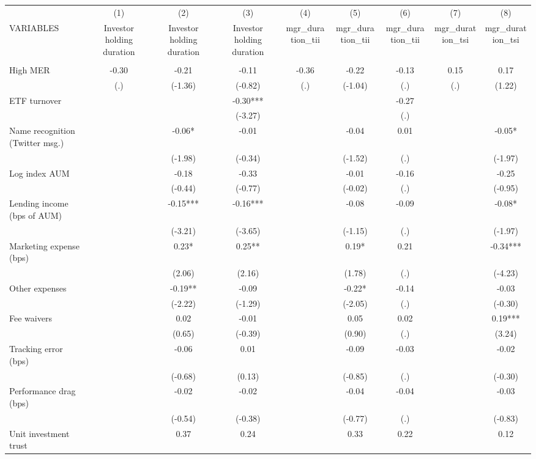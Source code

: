 \documentclass[]{article}
\begin{document}
\begin{tabular}{lcccccccc} \hline
 & (1) & (2) & (3) & (4) & (5) & (6) & (7) & (8) \\
VARIABLES & Investor holding duration & Investor holding duration & Investor holding duration & mgr\_duration\_tii & mgr\_duration\_tii & mgr\_duration\_tii & mgr\_duration\_tsi & mgr\_duration\_tsi \\ \hline
 &  &  &  &  &  &  &  &  \\
High MER & -0.30 & -0.21 & -0.11 & -0.36 & -0.22 & -0.13 & 0.15 & 0.17 \\
 & (.) & (-1.36) & (-0.82) & (.) & (-1.04) & (.) & (.) & (1.22) \\
ETF turnover &  &  & -0.30*** &  &  & -0.27 &  &  \\
 &  &  & (-3.27) &  &  & (.) &  &  \\
Name recognition (Twitter msg.) &  & -0.06* & -0.01 &  & -0.04 & 0.01 &  & -0.05* \\
 &  & (-1.98) & (-0.34) &  & (-1.52) & (.) &  & (-1.97) \\
Log index AUM &  & -0.18 & -0.33 &  & -0.01 & -0.16 &  & -0.25 \\
 &  & (-0.44) & (-0.77) &  & (-0.02) & (.) &  & (-0.95) \\
Lending income (bps of AUM) &  & -0.15*** & -0.16*** &  & -0.08 & -0.09 &  & -0.08* \\
 &  & (-3.21) & (-3.65) &  & (-1.15) & (.) &  & (-1.97) \\
Marketing expense (bps) &  & 0.23* & 0.25** &  & 0.19* & 0.21 &  & -0.34*** \\
 &  & (2.06) & (2.16) &  & (1.78) & (.) &  & (-4.23) \\
Other expenses &  & -0.19** & -0.09 &  & -0.22* & -0.14 &  & -0.03 \\
 &  & (-2.22) & (-1.29) &  & (-2.05) & (.) &  & (-0.30) \\
Fee waivers &  & 0.02 & -0.01 &  & 0.05 & 0.02 &  & 0.19*** \\
 &  & (0.65) & (-0.39) &  & (0.90) & (.) &  & (3.24) \\
Tracking error (bps) &  & -0.06 & 0.01 &  & -0.09 & -0.03 &  & -0.02 \\
 &  & (-0.68) & (0.13) &  & (-0.85) & (.) &  & (-0.30) \\
Performance drag (bps) &  & -0.02 & -0.02 &  & -0.04 & -0.04 &  & -0.03 \\
 &  & (-0.54) & (-0.38) &  & (-0.77) & (.) &  & (-0.83) \\
Unit investment trust &  & 0.37 & 0.24 &  & 0.33 & 0.22 &  & 0.12 \\

\end{tabular}
\end{document}
